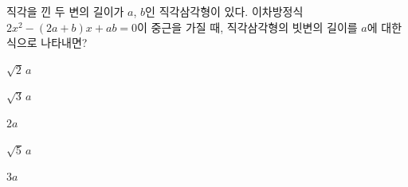 직각을 낀 두 변의 길이가 $a$, $b$인 직각삼각형이 있다. 이차방정식 $2x^2-(2a+b)x+ab=0$이 중근을 가질 때, 직각삼각형의 빗변의 길이를 $a$에 대한 식으로 나타내면?
\begin{choices32}{\rule[-3ex]{0pt}{8ex}$\sqrt{2}\,a$}{\rule[-3ex]{0pt}{8ex}$\sqrt{3}\,a$}{\rule[-3ex]{0pt}{8ex}$2a$}{\rule[-3ex]{0pt}{8ex}$\sqrt{5}\,a$}{\rule[-3ex]{0pt}{8ex}$3a$}\end{choices32}
